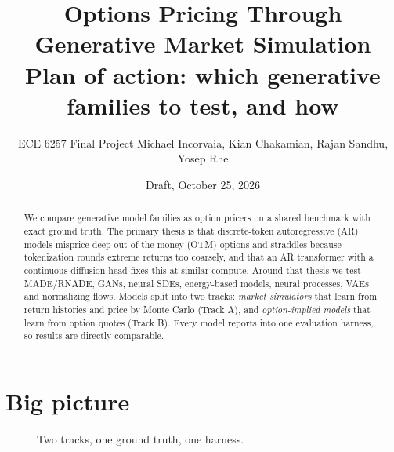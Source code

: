 \documentclass[10pt]{article}
\title{Options Pricing Through Generative Market Simulation\\[2pt]
\large Plan of action: which generative families to test, and how}
\author{ECE 6257 Final Project \quad Michael Incorvaia, Kian Chakamian, Rajan Sandhu, Yosep Rhe}
\date{Draft, October 25, 2026}
\begin{document}
\maketitle

\begin{abstract}
We compare generative model families as option pricers on a shared benchmark with exact ground truth.
The primary thesis is that discrete-token autoregressive (AR) models misprice deep out-of-the-money (OTM)
options and straddles because tokenization rounds extreme returns too coarsely, and that an AR transformer with a
continuous diffusion head fixes this at similar compute. Around that thesis we test MADE/RNADE, GANs, neural SDEs,
energy-based models, neural processes, VAEs and normalizing flows. Models split into two tracks:
\emph{market simulators} that learn from return histories and price by Monte Carlo (Track A), and
\emph{option-implied models} that learn from option quotes (Track B). Every model reports into one evaluation
harness, so results are directly comparable.
\end{abstract}

\section{Big picture}

\begin{figure}[h]
\centering
{}
\caption{Two tracks, one ground truth, one harness.}
\end{figure}
\end{document}
